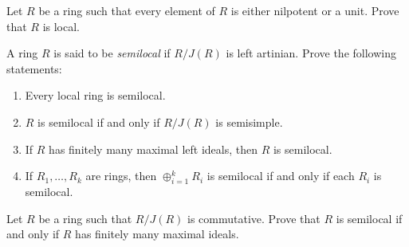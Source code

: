 \begin{exercise}
\label{xca:nilp_or_unit}
    Let $R$ be a ring such that every element of $R$ is either 
    nilpotent or a unit. Prove that $R$ is local. 
\end{exercise}

\begin{bonus}
\label{xca:semilocal}
    A ring $R$ is said to be \emph{semilocal} if $R/J(R)$ is left artinian. 
    Prove the following statements:
    \begin{enumerate}
        \item Every local ring is semilocal.
        \item $R$ is semilocal if and only if $R/J(R)$ is semisimple.
        \item If $R$ has finitely many maximal left ideals, then $R$ is semilocal. 
        \item If $R_1,\dots,R_k$ are rings, then $\oplus_{i=1}^k R_i$ is semilocal
            if and only if each $R_i$ is semilocal. 
    \end{enumerate}
\end{bonus}

\begin{bonus}
\label{xca:semilocal_commutative}
    Let $R$ be a ring such that $R/J(R)$ is commutative. Prove
    that $R$ is semilocal if and only if $R$ has finitely many maximal ideals. 
\end{bonus}





